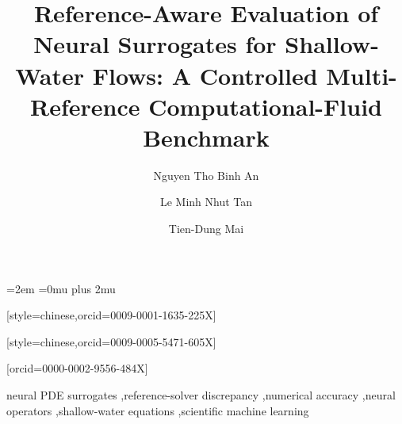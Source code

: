 \documentclass[a4paper,fleqn]{cas-sc}
\begin{document}
\let\WriteBookmarks\relax
\def\floatpagepagefraction{1}
\def\textpagefraction{.001}
\emergencystretch=2em
\Urlmuskip=0mu plus 2mu


\title[mode=title]{Reference-Aware Evaluation of Neural Surrogates for Shallow-Water Flows: A Controlled Multi-Reference Computational-Fluid Benchmark}

\author[1,2]{Nguyen Tho Binh An}
[style=chinese,orcid=0009-0001-1635-225X]
\fnmark[1]

\author[1,2]{Le Minh Nhut Tan}
[style=chinese,orcid=0009-0005-5471-605X]
\fnmark[1]

\author[1,2]{Tien-Dung Mai}
[orcid=0000-0002-9556-484X]
\cormark[1]






\begin{keywords}
neural PDE surrogates \sep reference-solver discrepancy \sep numerical accuracy \sep neural operators \sep shallow-water equations \sep scientific machine learning
\end{keywords}

\maketitle














\appendix


\clearpage



\end{document}
